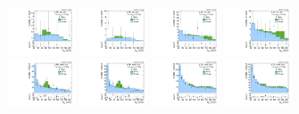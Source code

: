 \begin{figure}[htbp]
  \centering
  \includegraphics[width=0.18\textwidth]{fig/fitValidation/PostFit_SR_MJJ_MVV1500to5000__mu_HP_bb_LDy_Run2.pdf}
  \includegraphics[width=0.18\textwidth]{fig/fitValidation/PostFit_SR_MJJ_MVV1500to5000__e_HP_bb_LDy_Run2.pdf}
  \includegraphics[width=0.18\textwidth]{fig/fitValidation/PostFit_SR_MJJ_MVV1500to5000__mu_LP_bb_LDy_Run2.pdf}
  \includegraphics[width=0.18\textwidth]{fig/fitValidation/PostFit_SR_MJJ_MVV1500to5000__e_LP_bb_LDy_Run2.pdf}\\
  \includegraphics[width=0.18\textwidth]{fig/fitValidation/PostFit_SR_MJJ_MVV1500to5000__mu_HP_nobb_LDy_Run2.pdf}
  \includegraphics[width=0.18\textwidth]{fig/fitValidation/PostFit_SR_MJJ_MVV1500to5000__e_HP_nobb_LDy_Run2.pdf}
  \includegraphics[width=0.18\textwidth]{fig/fitValidation/PostFit_SR_MJJ_MVV1500to5000__mu_LP_nobb_LDy_Run2.pdf}
  \includegraphics[width=0.18\textwidth]{fig/fitValidation/PostFit_SR_MJJ_MVV1500to5000__e_LP_nobb_LDy_Run2.pdf}\\

\end{figure}
